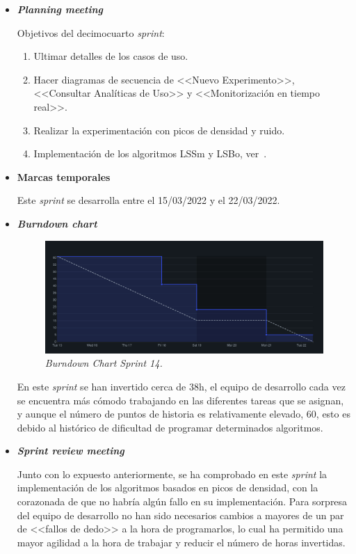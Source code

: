 \begin{itemize}
\item \textbf{\textit{Planning meeting}}

Objetivos del decimocuarto \textit{sprint}:
\begin{enumerate}
\item Ultimar detalles de los casos de uso.
\item Hacer diagramas de secuencia de <<Nuevo Experimento>>, <<Consultar Analíticas de Uso>> y <<Monitorización en tiempo real>>.
\item Realizar la experimentación con picos de densidad y ruido.
\item Implementación de los algoritmos LSSm y LSBo, ver~\cite{leyva2015three}.
\end{enumerate}
\item \textbf{Marcas temporales}

Este \textit{sprint} se desarrolla entre el 15/03/2022 y el 22/03/2022.
\item \textbf{\textit{Burndown chart}} 
\begin{figure}
\begin{center}
\includegraphics[width=\textwidth]{../img/anexos/sprints/BD-Sprint14}
\caption{\textit{Burndown Chart Sprint 14.}}\label{fig:BD-Sprint14}
\end{center}
\end{figure}

En este \textit{sprint} se han invertido cerca de 38h, el equipo de desarrollo cada vez se encuentra más cómodo trabajando en las diferentes tareas que se asignan, y aunque el número de puntos de historia es relativamente elevado, 60, esto es debido al histórico de dificultad de programar determinados algoritmos. 

\item \textbf{\textit{Sprint review meeting}}

Junto con lo expuesto anteriormente, se ha comprobado en este \textit{sprint} la implementación de los algoritmos basados en picos de densidad, con la corazonada de que no habría algún fallo en su implementación. Para sorpresa del equipo de desarrollo no han sido necesarios cambios a mayores de un par de <<fallos de dedo>> a la hora de programarlos, lo cual ha permitido una mayor agilidad a la hora de trabajar y reducir el número de horas invertidas.
\end{itemize}

